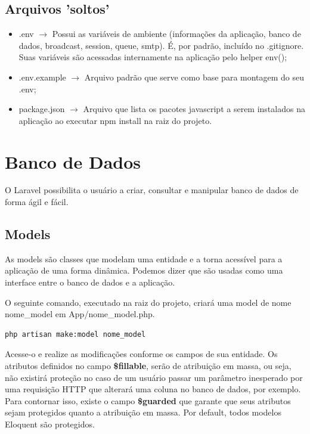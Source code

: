 \documentclass[
12pt,				%
openany,			%
twoside,			%
a4paper,			%
english,			%
french,				%
spanish,			%
brazil,				%
]{abntex2}
\begin{document}
\subsection{Arquivos 'soltos'}

\begin{itemize}
    \item .env $\rightarrow$ Possui as variáveis de ambiente (informações da aplicação, banco de dados, broadcast, session, queue, smtp). É, por padrão, incluído no .gitignore. Suas variáveis são acessadas internamente na aplicação pelo helper env();

    \item .env.example $\rightarrow$ Arquivo padrão que serve como base para montagem do seu .env;

    \item package.json $\rightarrow$ Arquivo que lista os pacotes javascript a serem instalados na aplicação ao executar npm install na raiz do projeto.

\end{itemize}


\section{Banco de Dados}
O Laravel possibilita o usuário a criar, consultar e manipular banco de dados de forma ágil e fácil.

\subsection{Models}
As models são classes que modelam uma entidade e a torna acessível para a aplicação de
uma forma dinâmica. Podemos dizer que são usadas como uma interface entre o banco de
dados e a aplicação.

O seguinte comando, executado na raiz do projeto, criará uma model de nome nome\_model
em App/nome\_model.php.

\begin{lstlisting}[style=bash,caption={Criando uma model}]
    php artisan make:model nome_model
\end{lstlisting}


Acesse-o e realize as modificações conforme os campos de sua entidade. Os atributos
definidos no campo \textbf{\$fillable}, serão de atribuição em massa, ou seja, não existirá
proteção no caso de um usuário passar um parâmetro inesperado por uma requisição HTTP
que alterará uma coluna no banco de dados, por exemplo. Para contornar isso, existe o
campo \textbf{\$guarded} que garante que seus atributos sejam protegidos quanto a atribuição em
massa. Por default, todos modelos Eloquent são protegidos.
\end{document}
